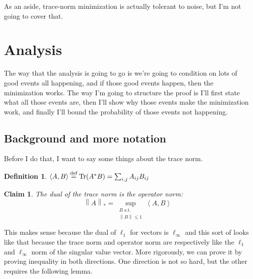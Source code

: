 \documentclass[11pt]{article}
\DeclareMathOperator*{\Tr}{Tr}
\newcommand{\inprod}[1]{\left\langle #1 \right\rangle}
\newcommand{\eqdef}{\mathbin{\stackrel{\rm def}{=}}}
\newcommand{\norm}[1]{\left\| #1 \right\|}
\newtheorem{definition}[theorem]{Definition}
\newtheorem{claim}[theorem]{Claim}
\begin{document}
As an aside, trace-norm minimization is actually tolerant to noise, but I'm not going to cover that.

\section{Analysis}
The way that the analysis is going to go is we're going to condition on lots of good events all happening, and if those good events happen, then the minimization works. The way I'm going to structure the proof is I'll first state what all those events are, then I'll show why those events make the minimization work, and finally I'll bound the probability of those events not happening.

\subsection{Background and more notation}
Before I do that, I want to say some things about the trace norm.
\begin{definition}
$\inprod{A, B} \eqdef \Tr(A^*B) = \sum_{i,j} A_{ij} B_{ij}$
\end{definition}

\begin{claim}
\label{tracedual}
The dual of the trace norm is the operator norm:
\[
\norm{A}_{*} = \sup_{\substack{ B \text{ s.t.} \\ \norm{B} \le 1}} \inprod{A, B} 
\]
\end{claim}
This makes sense because the dual of $\ell_1$ for vectors is $\ell_\infty$ and this sort of looks like that because the trace norm and operator norm are respectively like the $\ell_1$ and $\ell_\infty$ norm of the singular value vector. More rigorously, we can prove it by proving inequality in both directions. One direction is not so hard, but the other requires the following lemma.
\end{document}
